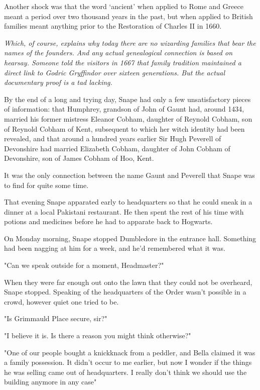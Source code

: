 Another shock was that the word `ancient' when applied to Rome and Greece meant a period over two thousand years in the past, but when applied to British families meant anything prior to the Restoration of Charles II in 1660.

\emph{Which, of course, explains why today there are no wizarding families that bear the names of the founders. And any actual genealogical connection is based on hearsay. Someone told the visitors in 1667 that family tradition maintained a direct link to Godric Gryffindor over sixteen generations. But the actual documentary proof is a tad lacking.}

By the end of a long and trying day, Snape had only a few unsatisfactory pieces of information: that Humphrey, grandson of John of Gaunt had, around 1434, married his former mistress Eleanor Cobham, daughter of Reynold Cobham, son of Reynold Cobham of Kent, subsequent to which her witch identity had been revealed, and that around a hundred years earlier Sir Hugh Peverell of Devonshire had married Elizabeth Cobham, daughter of John Cobham of Devonshire, son of James Cobham of Hoo, Kent.

It was the only connection between the name Gaunt and Peverell that Snape was to find for quite some time.

That evening Snape apparated early to headquarters so that he could sneak in a dinner at a local Pakistani restaurant. He then spent the rest of his time with potions and medicines before he had to apparate back to Hogwarts.

On Monday morning, Snape stopped Dumbledore in the entrance hall. Something had been nagging at him for a week, and he'd remembered what it was.

"Can we speak outside for a moment, Headmaster?"

When they were far enough out onto the lawn that they could not be overheard, Snape stopped. Speaking of the headquarters of the Order wasn't possible in a crowd, however quiet one tried to be.

"Is Grimmauld Place secure, sir?"

"I believe it is. Is there a reason you might think otherwise?"

"One of our people bought a knickknack from a peddler, and Bella claimed it was a family possession. It didn't occur to me earlier, but now I wonder if the things he was selling came out of headquarters. I really don't think we should use the building anymore in any case{\el}"

